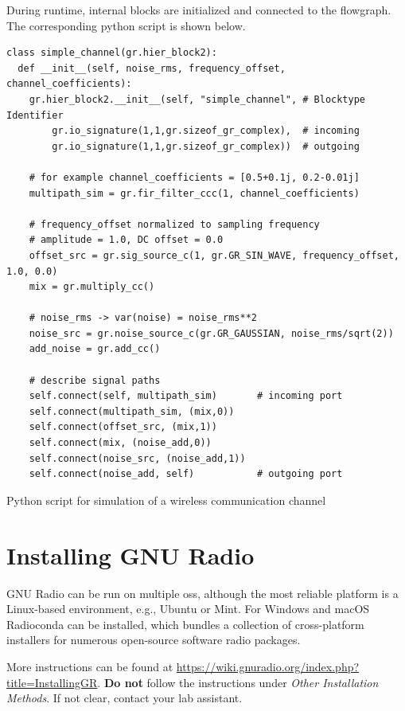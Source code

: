 During runtime, internal blocks are initialized and connected to the flowgraph.
The corresponding python script is shown below.
\begin{program}[thb]
\begin{verbatim}
class simple_channel(gr.hier_block2):
  def __init__(self, noise_rms, frequency_offset, channel_coefficients):
    gr.hier_block2.__init__(self, "simple_channel", # Blocktype Identifier
        gr.io_signature(1,1,gr.sizeof_gr_complex),  # incoming
        gr.io_signature(1,1,gr.sizeof_gr_complex))  # outgoing

    # for example channel_coefficients = [0.5+0.1j, 0.2-0.01j]
    multipath_sim = gr.fir_filter_ccc(1, channel_coefficients)

    # frequency_offset normalized to sampling frequency
    # amplitude = 1.0, DC offset = 0.0
    offset_src = gr.sig_source_c(1, gr.GR_SIN_WAVE, frequency_offset, 1.0, 0.0)
    mix = gr.multiply_cc()

    # noise_rms -> var(noise) = noise_rms**2
    noise_src = gr.noise_source_c(gr.GR_GAUSSIAN, noise_rms/sqrt(2))
    add_noise = gr.add_cc()

    # describe signal paths
    self.connect(self, multipath_sim)       # incoming port
    self.connect(multipath_sim, (mix,0))
    self.connect(offset_src, (mix,1))
    self.connect(mix, (noise_add,0))
    self.connect(noise_src, (noise_add,1))
    self.connect(noise_add, self)           # outgoing port
\end{verbatim}
\caption{Python script for simulation of a wireless communication channel}
\end{program}

\section{Installing GNU Radio}

GNU Radio can be run on multiple \glspl{os}, although the most reliable platform is a Linux-based environment, e.g., Ubuntu or Mint.
For Windows and macOS Radioconda can be installed, which bundles a collection of cross-platform installers for numerous open-source software radio packages.

More instructions can be found at \url{https://wiki.gnuradio.org/index.php?title=InstallingGR}. \textbf{Do not} follow the instructions under \textit{Other Installation Methods}. If not clear, contact your lab assistant.






